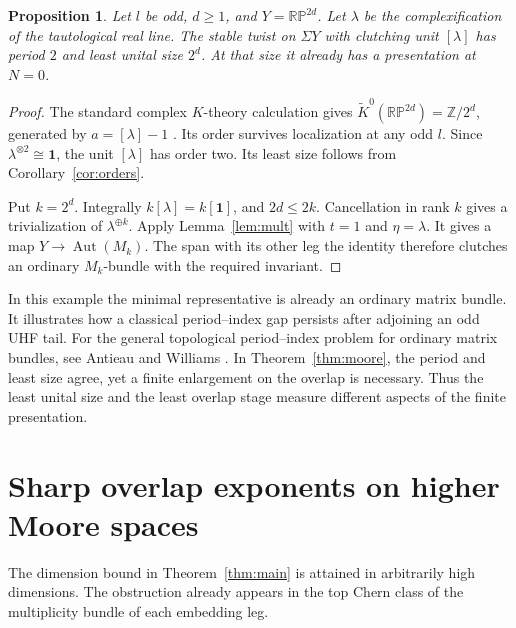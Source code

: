 \documentclass[11pt]{article}
\newtheorem{proposition}[theorem]{Proposition}
\DeclareMathOperator{\Aut}{Aut}
\newcommand{\Z}{\mathbb Z}
\newcommand{\triv}{\mathbf 1}
\newcommand{\RP}{\mathbb{RP}}
\begin{document}
\begin{proposition}\label{prop:projective}
Let \(l\) be odd, \(d\geq1\), and \(Y=\RP^{2d}\). Let \(\lambda\) be the complexification of the tautological real line. The stable twist on \(\Sigma Y\) with clutching unit \([\lambda]\) has period \(2\) and least unital size \(2^d\). At that size it already has a presentation at \(N=0\).
\end{proposition}
\begin{proof}
The standard complex \(K\)-theory calculation gives
\(\widetilde K^0(\RP^{2d})=\Z/2^d\), generated by \(a=[\lambda]-1\)
\cite[Theorem 4.6.1]{RW}. Its order survives localization at any odd \(l\). Since \(\lambda^{\otimes2}\cong\triv\), the unit \([\lambda]\) has order two. Its least size follows from Corollary~\ref{cor:orders}.

Put \(k=2^d\). Integrally \(k[\lambda]=k[\triv]\), and \(2d\leq2k\). Cancellation in rank \(k\) gives a trivialization of \(\lambda^{\oplus k}\). Apply Lemma~\ref{lem:mult} with \(t=1\) and \(\eta=\lambda\). It gives a map \(Y\to\Aut(M_k)\). The span with its other leg the identity therefore clutches an ordinary \(M_k\)-bundle with the required invariant.
\end{proof}

In this example the minimal representative is already an ordinary matrix bundle. It illustrates how a classical period--index gap persists after adjoining an odd UHF tail. For the general topological period--index problem for ordinary matrix bundles, see Antieau and Williams \cite{AW}. In Theorem~\ref{thm:moore}, the period and least size agree, yet a finite enlargement on the overlap is necessary. Thus the least unital size and the least overlap stage measure different aspects of the finite presentation.

\section{Sharp overlap exponents on higher Moore spaces}\label{sec:sharp-overlap}

The dimension bound in Theorem~\ref{thm:main} is attained in
arbitrarily high dimensions. The obstruction already appears in the
top Chern class of the multiplicity bundle of each embedding leg.
\end{document}
